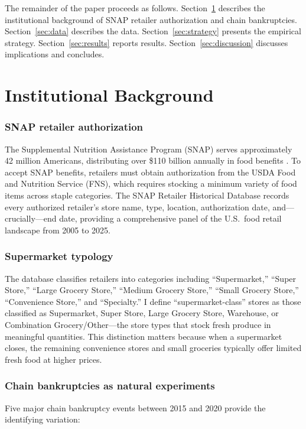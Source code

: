 \documentclass[12pt]{article}
\begin{document}
The remainder of the paper proceeds as follows. Section~\ref{sec:background} describes the institutional background of SNAP retailer authorization and chain bankruptcies. Section~\ref{sec:data} describes the data. Section~\ref{sec:strategy} presents the empirical strategy. Section~\ref{sec:results} reports results. Section~\ref{sec:discussion} discusses implications and concludes.

\section{Institutional Background}
\label{sec:background}

\subsubsection*{SNAP retailer authorization} The Supplemental Nutrition Assistance Program (SNAP) serves approximately 42 million Americans, distributing over \$110 billion annually in food benefits \citep{usda2023snap}. To accept SNAP benefits, retailers must obtain authorization from the USDA Food and Nutrition Service (FNS), which requires stocking a minimum variety of food items across staple categories. The SNAP Retailer Historical Database records every authorized retailer's store name, type, location, authorization date, and---crucially---end date, providing a comprehensive panel of the U.S.\ food retail landscape from 2005 to 2025.

\subsubsection*{Supermarket typology} The database classifies retailers into categories including ``Supermarket,'' ``Super Store,'' ``Large Grocery Store,'' ``Medium Grocery Store,'' ``Small Grocery Store,'' ``Convenience Store,'' and ``Specialty.'' I define ``supermarket-class'' stores as those classified as Supermarket, Super Store, Large Grocery Store, Warehouse, or Combination Grocery/Other---the store types that stock fresh produce in meaningful quantities. This distinction matters because when a supermarket closes, the remaining convenience stores and small groceries typically offer limited fresh food at higher prices.

\subsubsection*{Chain bankruptcies as natural experiments} Five major chain bankruptcy events between 2015 and 2020 provide the identifying variation:
\end{document}

